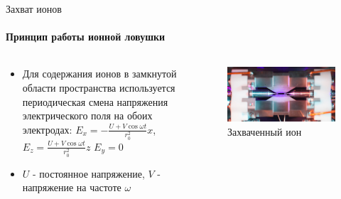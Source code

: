 \documentclass{beamer}
\begin{document}
	\begin{frame}{Захват ионов}
		\framesubtitle{Принцип работы ионной ловушки}
		
		\begin{columns}
			
			\begin{column}{0.5\textwidth}
				
				\begin{itemize}
					\item<2-> Для содержания ионов в замкнутой области пространства используется
					периодическая смена напряжения электрического поля на обоих электродах:
					$E_x = - \frac{U + V \cos{\omega t}}{r_{0}^2} x$,
					$E_z = \frac{U + V \cos{\omega t}}{r_{0}^2} z$
					$E_y = 0$
					\item<2-> $U$ - постоянное напряжение, $V$ - напряжение на частоте $\omega$
				\end{itemize}
				
			\end{column}
			
			\begin{column}{0.5\textwidth}
				\begin{figure}
					\centering
					\includegraphics[width=\textwidth]{media/trapped-ion.jpg}
					\caption{Захваченный ион}
				\end{figure}
			\end{column}
			
		\end{columns}
	\end{frame}
	
	
	
\end{document}
